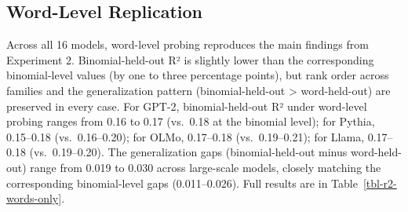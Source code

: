 \documentclass[11pt]{article}
\begin{document}
\endgroup{}

\subsection{Word-Level Replication}\label{sec-appendix-words-only-exp2}

Across all 16 models, word-level probing reproduces the main findings
from Experiment 2. Binomial-held-out R² is slightly lower than the
corresponding binomial-level values (by one to three percentage points),
but rank order across families and the generalization pattern
(binomial-held-out \textgreater{} word-held-out) are preserved in every
case. For GPT-2, binomial-held-out R² under word-level probing ranges
from 0.16 to 0.17 (vs.~0.18 at the binomial level); for Pythia,
0.15--0.18 (vs.~0.16--0.20); for OLMo, 0.17--0.18 (vs.~0.19--0.21); for
Llama, 0.17--0.18 (vs.~0.19--0.20). The generalization gaps
(binomial-held-out minus word-held-out) range from 0.019 to 0.030 across
large-scale models, closely matching the corresponding binomial-level
gaps (0.011--0.026). Full results are in Table~\ref{tbl-r2-words-only}.

\begingroup\fontsize{8}{10}\selectfont
\end{document}
